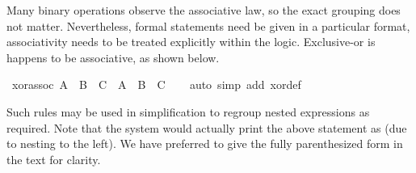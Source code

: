 \begin{isabellebody}
\begin{isamarkuptext}
  Many binary operations observe the associative law, so the exact
  grouping does not matter.  Nevertheless, formal statements need be
  given in a particular format, associativity needs to be treated
  explicitly within the logic.  Exclusive-or is happens to be
  associative, as shown below.%
\end{isamarkuptext}%
\isamarkuptrue%
\ xor{\isacharunderscore}assoc{\isacharcolon}\ {\isachardoublequote}{\isacharparenleft}A\ {\isacharbrackleft}{\isacharplus}{\isacharbrackright}\ B{\isacharparenright}\ {\isacharbrackleft}{\isacharplus}{\isacharbrackright}\ C\ {\isacharequal}\ A\ {\isacharbrackleft}{\isacharplus}{\isacharbrackright}\ {\isacharparenleft}B\ {\isacharbrackleft}{\isacharplus}{\isacharbrackright}\ C{\isacharparenright}{\isachardoublequote}\isanewline
\ \ \isamarkupfalse%
\ {\isacharparenleft}auto\ simp\ add{\isacharcolon}\ xor{\isacharunderscore}def{\isacharparenright}\isamarkupfalse%
%
\begin{isamarkuptext}%
Such rules may be used in simplification to regroup nested
  expressions as required.  Note that the system would actually print
  the above statement as 
  (due to nesting to the left).  We have preferred to give the fully
  parenthesized form in the text for clarity.%
\end{isamarkuptext}%
\isamarkuptrue%
\isamarkuptrue%
\isamarkuptrue%
\isamarkupfalse%
\isamarkupfalse%
\isamarkupfalse%
\isamarkupfalse%
\isamarkuptrue%
\isamarkuptrue%
\isamarkupfalse%
\isamarkuptrue%
\isamarkuptrue%
\isamarkuptrue%
\isamarkupfalse%
\isamarkuptrue%
\isamarkuptrue%
\isamarkuptrue%
\isamarkuptrue%
\isamarkuptrue%
\isamarkuptrue%
\isamarkuptrue%
\isamarkupfalse%
\end{isabellebody}%

